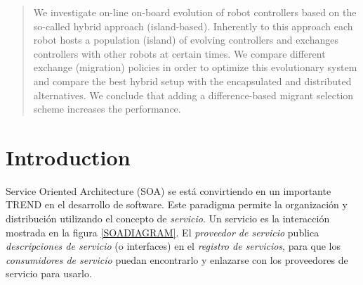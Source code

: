 \documentclass[runningheads]{llncs}
\begin{document}
\begin{abstract}
We investigate on-line on-board evolution of robot controllers based
on the so-called hybrid approach (island-based). Inherently to this approach each
robot hosts a population (island) of evolving controllers and
exchanges controllers with other robots at certain times. We compare
different exchange (migration) policies in order to optimize this
evolutionary system and compare the best hybrid setup with the
encapsulated and distributed alternatives. We conclude that adding a difference-based migrant
 selection scheme increases the performance.
 


\end{abstract}

\section{Introduction}
\noindent Service Oriented Architecture (SOA) \cite{PAPAZOGLOU} se está convirtiendo en un importante TREND en el desarrollo de software. Este paradigma permite la organización y distribución utilizando el concepto de {\em servicio}. Un servicio es la interacción mostrada en la figura \ref{SOADIAGRAM}. El {\em proveedor de servicio} publica {\em descripciones de servicio} (o interfaces) en el {\em registro de servicios}, para que los {\em consumidores de servicio} puedan encontrarlo y enlazarse con los proveedores de servicio para usarlo.
\end{document}
